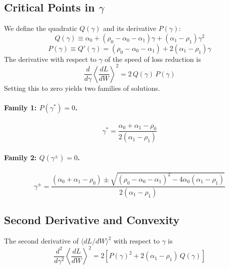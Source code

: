 \documentclass[12pt]{article}
\begin{document}
\subsection*{Critical Points in $\gamma$}

We define the quadratic $Q(\gamma)$ and its derivative $P(\gamma)$:
\begin{equation}
    Q(\gamma) \equiv \alpha_0 + (\rho_0 - \alpha_0 - \alpha_1)\gamma + (\alpha_1 - \rho_1)\gamma^2
\end{equation}
\begin{equation}
    P(\gamma) \equiv Q'(\gamma) = (\rho_0 - \alpha_0 - \alpha_1) + 2(\alpha_1 - \rho_1)\gamma
\end{equation}
The derivative with respect to $\gamma$ of the speed of loss reduction is
\begin{equation}
    \frac{d}{d\gamma}\left\langle \frac{dL}{dW} \right\rangle^2 = 2\,Q(\gamma)\,P(\gamma)
\end{equation}
Setting this to zero yields two families of solutions.

\paragraph{Family 1: $P(\gamma^*) = 0$.}
\begin{equation}
    \gamma^* = \frac{\alpha_0 + \alpha_1 - \rho_0}{2(\alpha_1 - \rho_1)}
\end{equation}

\paragraph{Family 2: $Q(\gamma^\pm) = 0$.}
\begin{equation}
    \gamma^{\pm} = \frac{(\alpha_0 + \alpha_1 - \rho_0) \pm \sqrt{(\rho_0 - \alpha_0 - \alpha_1)^2 - 4\alpha_0(\alpha_1 - \rho_1)}}{2(\alpha_1 - \rho_1)}
\end{equation}

\subsection*{Second Derivative and Convexity}

The second derivative of $\langle dL/dW \rangle^2$ with respect to $\gamma$ is
\begin{equation}
    \frac{d^2}{d\gamma^2}\left\langle \frac{dL}{dW} \right\rangle^2 = 2\left[P(\gamma)^2 + 2(\alpha_1 - \rho_1)\,Q(\gamma)\right]
\end{equation}
\end{document}
